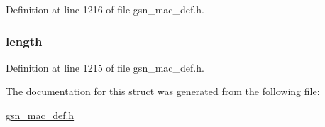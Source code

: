 Definition at line 1216 of file gsn\_\-mac\_\-def.h.

\hypertarget{a00123_ae360fb41f422c7c83b87d9af070cbd31}{
\subsubsection[{length}]{ {\bf length}}}
\label{a00123_ae360fb41f422c7c83b87d9af070cbd31}


Definition at line 1215 of file gsn\_\-mac\_\-def.h.



The documentation for this struct was generated from the following file:\begin{DoxyCompactItemize}
\item 
\hyperlink{a00522}{gsn\_\-mac\_\-def.h}\end{DoxyCompactItemize}
